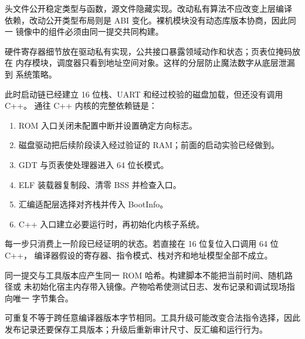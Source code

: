 头文件公开稳定类型与函数，源文件隐藏实现。改动私有算法不应改变上层编译
依赖，改动公开类型布局则是 ABI 变化。裸机模块没有动态库版本协商，因此同一
镜像中的组件必须由同一提交共同构建。

硬件寄存器细节放在驱动私有实现，公共接口暴露领域动作和状态；页表位掩码放在
内存模块，调度器只看到地址空间对象。这样的分层防止魔法数字从底层泄漏到
系统策略。

此时启动链已经建立 16 位栈、UART 和经过校验的磁盘加载，但还没有调用 C++。
通往 C++ 内核的完整依赖链是：

\begin{enumerate}[label=\arabic*.]
  \item ROM 入口关闭未配置中断并设置确定方向标志。
  \item 磁盘驱动把后续阶段读入经过验证的 RAM；前面的启动实验已经做到。
  \item GDT 与页表使处理器进入 64 位长模式。
  \item ELF 装载器复制段、清零 BSS 并检查入口。
  \item 汇编适配层选择对齐栈并传入 BootInfo。
  \item C++ 入口建立必要运行时，再初始化内核子系统。
\end{enumerate}

每一步只消费上一阶段已经证明的状态。若直接在 16 位复位入口调用 64 位 C++，
编译器假设的寄存器、指令模式、栈对齐和地址模型全部不成立。

同一提交与工具版本应产生同一 ROM 哈希。构建脚本不能把当前时间、随机路径或
未初始化宿主内存带入镜像。产物哈希使测试日志、发布记录和调试现场指向唯一
字节集合。

可重复不等于跨任意编译器版本字节相同。工具升级可能改变合法指令选择，因此
发布记录还要保存工具版本；升级后重新审计尺寸、反汇编和运行行为。
